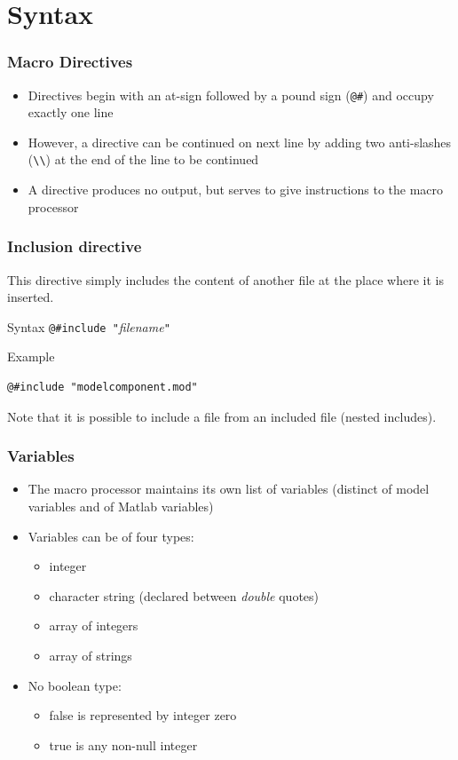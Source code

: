 \documentclass{beamer}
\begin{document}
\section{Syntax}

\begin{frame}[fragile=singleslide]
  \frametitle{Macro Directives}
  \begin{itemize}
  \item Directives begin with an at-sign followed by a pound sign (\verb+@#+) and occupy exactly one line
  \item However, a directive can be continued on next line by adding two anti-slashes (\verb+\\+) at the end of the line to be continued
  \item A directive produces no output, but serves to give instructions to the macro processor
  \end{itemize}
\end{frame}

\begin{frame}[fragile=singleslide]
  \frametitle{Inclusion directive}
  This directive simply includes the content of another file at the place where it is inserted.
  \begin{block}{Syntax}
    \verb+@#include "+\textit{filename}\verb+"+
  \end{block}
  \begin{block}{Example}
\begin{verbatim}
@#include "modelcomponent.mod"
\end{verbatim}
  \end{block}
  Note that it is possible to include a file from an included file (nested includes).
\end{frame}

\begin{frame}
\frametitle{Variables}
\begin{itemize}
\item The macro processor maintains its own list of variables (distinct of model variables and of Matlab variables)
\item Variables can be of four types:
  \begin{itemize}
  \item integer
  \item character string (declared between \textit{double} quotes)
  \item array of integers
  \item array of strings
  \end{itemize}
\item No boolean type:
  \begin{itemize}
  \item false is represented by integer zero
  \item true is any non-null integer
  \end{itemize}
\end{itemize}
\end{frame}
\end{document}
